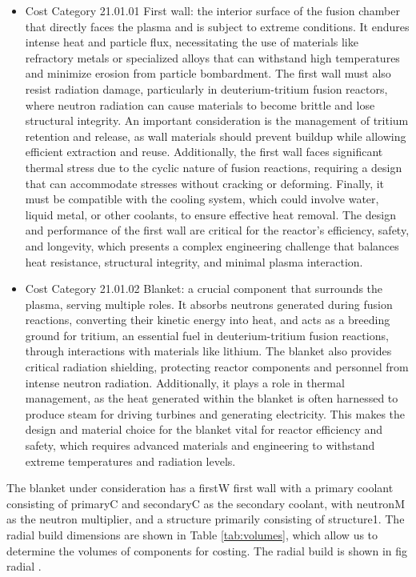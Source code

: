 \begin{itemize}
    \item Cost Category 21.01.01 First wall: the interior surface of the fusion chamber that directly faces the plasma and is subject to extreme conditions. It endures intense heat and particle flux, necessitating the use of materials like refractory metals or specialized alloys that can withstand high temperatures and minimize erosion from particle bombardment. The first wall must also resist radiation damage, particularly in deuterium-tritium fusion reactors, where neutron radiation can cause materials to become brittle and lose structural integrity. An important consideration is the management of tritium retention and release, as wall materials should prevent buildup while allowing efficient extraction and reuse. Additionally, the first wall faces significant thermal stress due to the cyclic nature of fusion reactions, requiring a design that can accommodate stresses without cracking or deforming. Finally, it must be compatible with the cooling system, which could involve water, liquid metal, or other coolants, to ensure effective heat removal. The design and performance of the first wall are critical for the reactor's efficiency, safety, and longevity, which presents a complex engineering challenge that balances heat resistance, structural integrity, and minimal plasma interaction.
    \item Cost Category 21.01.02 Blanket: a crucial component that surrounds the plasma, serving multiple roles. It absorbs neutrons generated during fusion reactions, converting their kinetic energy into heat, and acts as a breeding ground for tritium, an essential fuel in deuterium-tritium fusion reactions, through interactions with materials like lithium. The blanket also provides critical radiation shielding, protecting reactor components and personnel from intense neutron radiation. Additionally, it plays a role in thermal management, as the heat generated within the blanket is often harnessed to produce steam for driving turbines and generating electricity. This makes the design and material choice for the blanket vital for reactor efficiency and safety, which requires advanced materials and engineering to withstand extreme temperatures and radiation levels.
\end{itemize}

The blanket under consideration has a firstW first wall with a primary coolant consisting of primaryC and secondaryC as the secondary coolant, with neutronM as the neutron multiplier, and a structure primarily consisting of structure1. The radial build dimensions are shown in Table \ref{tab:volumes}, which allow us to determine the volumes of components for costing.  The radial build is shown in fig radial
.  \\


